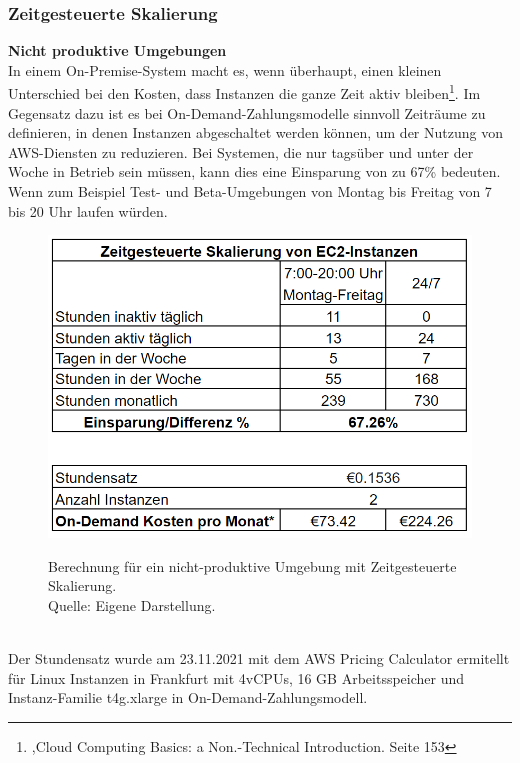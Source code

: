 \subsubsection{Zeitgesteuerte Skalierung}
\textbf{Nicht produktive Umgebungen}\\
In einem On-Premise-System macht es, wenn überhaupt, einen kleinen Unterschied bei den Kosten, dass Instanzen die ganze Zeit aktiv bleiben\footnote{\cite{CCB},Cloud Computing Basics: a Non.-Technical Introduction. Seite 153}. Im Gegensatz dazu ist es bei On-Demand-Zahlungsmodelle sinnvoll Zeiträume zu definieren, in denen Instanzen abgeschaltet werden können, um der Nutzung von AWS-Diensten zu reduzieren. Bei Systemen, die nur tagsüber und unter der Woche in Betrieb sein müssen, kann dies eine Einsparung von zu 67\% bedeuten.  Wenn zum Beispiel Test- und Beta-Umgebungen von Montag bis Freitag von 7 bis 20 Uhr laufen würden.
\begin{figure}[h]
  \centering
  \includegraphics[scale=0.6]{sources/Einsparung_Zeitgesteuerte_Skalierung}
  \caption[Berechnung für ein nicht produktives Umgebung mit Zeitgesteuerte Skalierung]{}
  \label{fig:Einsparung_Zeitgesteuerte_Skalierung} Berechnung für ein nicht-produktive Umgebung mit Zeitgesteuerte Skalierung. \\
  Quelle: Eigene Darstellung. 
\end{figure}
\\
Der Stundensatz wurde am 23.11.2021 mit dem AWS Pricing Calculator\cite{AMZ17} ermitellt für Linux Instanzen in Frankfurt mit 4vCPUs, 16 GB Arbeitsspeicher und Instanz-Familie t4g.xlarge in On-Demand-Zahlungsmodell.
